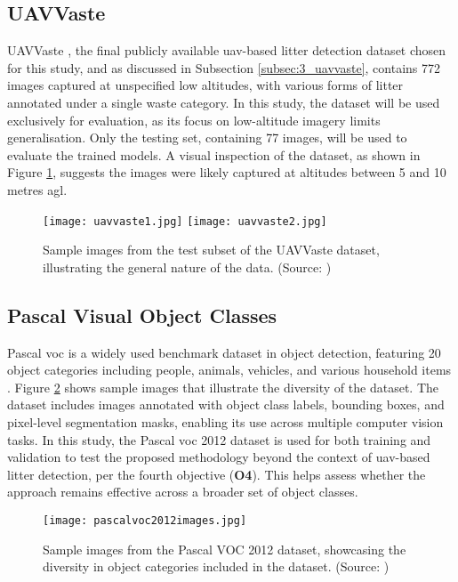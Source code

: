 \subsection{UAVVaste}
\label{subsec:4_uavvaste}

UAVVaste \cite{uavvaste}, the final publicly available \gls{uav}-based litter detection dataset chosen for this study, and as discussed in Subsection \ref{subsec:3_uavvaste}, contains 772 images captured at unspecified low altitudes, with various forms of litter annotated under a single waste category. In this study, the dataset will be used exclusively for evaluation, as its focus on low-altitude imagery limits generalisation. Only the testing set, containing 77 images, will be used to evaluate the trained models. A visual inspection of the dataset, as shown in Figure \ref{fig:uavvaste_samples}, suggests the images were likely captured at altitudes between 5 and 10 metres \gls{agl}.

\begin{figure}[!htbp]
  \centering
  \texttt{[image: uavvaste1.jpg]}
  \hfill
  \texttt{[image: uavvaste2.jpg]}
  \caption{Sample images from the test subset of the UAVVaste dataset, illustrating the general nature of the data. (Source: \cite{uavvaste})}
  \label{fig:uavvaste_samples}
\end{figure}


\subsection{Pascal Visual Object Classes}
\label{subsec:4_pascal_voc}

Pascal \gls{voc} is a widely used benchmark dataset in object detection, featuring 20 object categories including people, animals, vehicles, and various household items \cite{pascal-voc-2012}. Figure \ref{fig:pascal_voc} shows sample images that illustrate the diversity of the dataset. The dataset includes images annotated with object class labels, bounding boxes, and pixel-level segmentation masks, enabling its use across multiple computer vision tasks. In this study, the Pascal \gls{voc} 2012 dataset is used for both training and validation to test the proposed methodology beyond the context of \gls{uav}-based litter detection, per the fourth objective (\textbf{O4}). This helps assess whether the approach remains effective across a broader set of object classes. 

\begin{figure}[!htbp]
    \centering
    \texttt{[image: pascalvoc2012images.jpg]}
    \caption{Sample images from the Pascal VOC 2012 dataset, showcasing the diversity in object categories included in the dataset. (Source: \cite{pascal-voc-2012})}
    \label{fig:pascal_voc}%
\end{figure}

